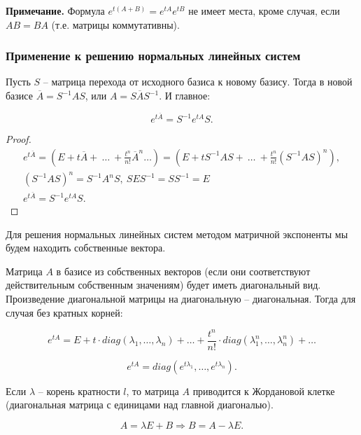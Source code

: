 \textbf{Примечание.} Формула $e^{t(A+B)} = e^{tA}e^{tB}$ не имеет места, кроме случая, если $AB = BA$ (т.е. матрицы коммутативны).

\subsubsection{Применение к решению нормальных линейных систем}

\begin{theorem}

Пусть $S$ -- матрица перехода от исходного базиса к новому базису. Тогда в новой базисе $\overline{A} = S^{-1}AS$, или $A = S\overline{A}S^{-1}$. И главное:

\[e^{t\overline{A}} = S^{-1}e^{tA}S.\]

\end{theorem}

\begin{proof}
	\begin{equation*}
		\begin{gathered}
 e^{t\overline{A}} = \left(E + t\overline{A} +\ \dots\ + \frac{t^{n}}{n!}\overline{A}^{n} \dots \right) = \left(E + tS^{-1}AS +\ \dots\ + \frac{t^{n}}{n!}(S^{-1}AS)^{n}\right), \\
 (S^{-1}AS)^n = S^{-1}A^nS,\ SES^{-1} = SS^{-1} = E \\
 e^{t\overline{A}} = S^{-1}e^{tA}S.
		\end{gathered}
	\end{equation*}
\end{proof}

Для решения нормальных линейных систем методом матричной экспоненты мы будем находить собственные вектора.

Матрица $A$ в базисе из собственных векторов (если они соответствуют действительным собственным значениям) будет иметь диагональный вид. Произведение диагональной матрицы на диагональную -- диагональная. Тогда для случая без кратных корней:

\[ e^{tA} = E + t\cdot diag(\lambda_1, \dots, \lambda_n) + \dots + \frac{t^n}{n!}\cdot diag(\lambda_1^n, \dots , \lambda_n^n) + \dots\]

\[ e^{tA} = diag(e^{t\lambda_1}, \dots, e^{t\lambda_n}).\]

Если $\lambda$ -- корень кратности $l$, то матрица $A$ приводится к Жордановой клетке (диагональная матрица с единицами над главной диагональю).

\[ A = \lambda E + B \Rightarrow B = A - \lambda E. \]


